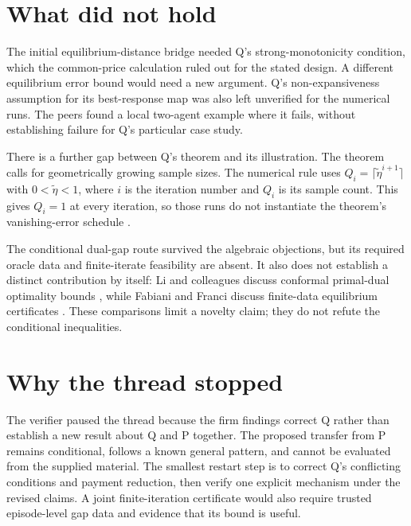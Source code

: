 \documentclass{article}
\begin{document}
\section{What did not hold}

The initial equilibrium-distance bridge needed Q's strong-monotonicity condition, which the common-price calculation
ruled out for the stated design. A different equilibrium error bound would need a new argument. Q's non-expansiveness
assumption for its best-response map was also left unverified for the numerical runs. The peers found a local
two-agent example where it fails, without establishing failure for Q's particular case study.

There is a further gap between Q's theorem and its illustration. The theorem calls for geometrically growing sample
sizes. The numerical rule uses \(Q_i=\lceil\widetilde\eta^{i+1}\rceil\) with \(0<\widetilde\eta<1\), where \(i\) is
the iteration number and \(Q_i\) is its sample count. This gives \(Q_i=1\) at every iteration, so those runs do not
instantiate the theorem's vanishing-error schedule \cite{Q}.

The conditional dual-gap route survived the algebraic objections, but its required oracle data and finite-iterate
feasibility are absent. It also does not establish a distinct contribution by itself: Li and colleagues discuss
conformal primal-dual optimality bounds \cite{Li2025}, while Fabiani and Franci discuss finite-data equilibrium
certificates \cite{FabianiFranci2026}. These comparisons limit a novelty claim; they do not refute the conditional
inequalities.

\section{Why the thread stopped}

The verifier paused the thread because the firm findings correct Q rather than establish a new result about Q and P
together. The proposed transfer from P remains conditional, follows a known general pattern, and cannot be evaluated
from the supplied material. The smallest restart step is to correct Q's conflicting conditions and payment reduction,
then verify one explicit mechanism under the revised claims. A joint finite-iteration certificate would also require
trusted episode-level gap data and evidence that its bound is useful.



\end{document}
